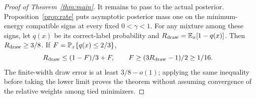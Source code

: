 \begin{proof}[Proof of Theorem~\ref{thm:main}]
It remains to pass to the actual posterior. Proposition~\ref{prop:rate}
puts asymptotic posterior mass one on the minimum-energy compatible
signs at every fixed $0<\gamma<1$. For any mixture among these signs,
let $q(x)$ be its correct-label probability and
$R_{\rm draw}=\mathbb E_x[1-q(x)]$. Then $R_{\rm draw}\ge3/8$.
If $F=\mathbb P_x\{q(x)\le2/3\}$,
\[
 R_{\rm draw}\le(1-F)/3+F,
 \qquad F\ge(3R_{\rm draw}-1)/2\ge1/16.
\]
The finite-width draw error is at least $3/8-o(1)$; applying the same
inequality before taking the lower limit proves the theorem without
assuming convergence of the relative weights among tied minimizers.
\end{proof}

